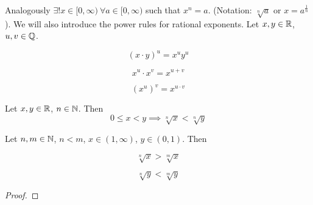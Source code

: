 \documentclass[../../script.tex]{subfiles}
\begin{document}
\begin{rem}
Analogously $\exists! x \in [0, \infty) ~\forall a \in [0, \infty)$ such that $x^n = a$. (Notation: $\sqrt[n]{a}$ or $x = a^{\frac{1}{n}}$). We will also introduce the power rules for rational exponents. Let $x, y \in \mathbb{R}$, $u, v \in \mathbb{Q}$.

\noindent\begin{minipage}[t]{.33\linewidth}
\[
	(x \cdot y)^u = x^u y^u
\]
\end{minipage}
\begin{minipage}[t]{.33\linewidth}
\[
	x^u \cdot x^v = x^{u+v}
\]
\end{minipage}
\begin{minipage}[t]{.33\linewidth}
\[
	(x^u)^v = x^{u \cdot v}
\]
\end{minipage}
\end{rem}

\begin{thm}
Let $x, y \in \mathbb{R}$, $n \in \mathbb{N}$. Then
\[
	0 \le x < y \implies \sqrt[n]{x} < \sqrt[n]{y}
\]

Let $n, m \in \mathbb{N}$, $n < m$, $x \in (1, \infty)$, $y \in (0, 1)$. Then

\noindent\begin{minipage}{.5\linewidth}
\[
	\sqrt[n]{x} > \sqrt[m]{x}
\]
\end{minipage}
\begin{minipage}{.5\linewidth}
\[
	\sqrt[n]{y} < \sqrt[m]{y}
\]
\end{minipage}
\end{thm}
\begin{proof}
\reader
\end{proof}
\end{document}
